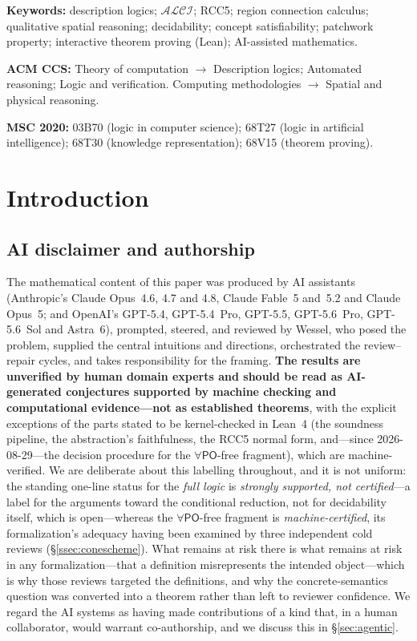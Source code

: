 \documentclass[11pt]{article}
\newcommand{\PO}{\mathsf{PO}}
\newcommand{\ALCI}{\ensuremath{\mathcal{ALCI}}}
\theoremstyle{plain}
\theoremstyle{definition}
\begin{document}
\medskip
\noindent\textbf{Keywords:} description logics; $\ALCI$; RCC5; region
connection calculus; qualitative spatial reasoning; decidability; concept
satisfiability; patchwork property; interactive theorem proving (Lean);
AI-assisted mathematics.

\smallskip
\noindent\textbf{ACM CCS:} Theory of computation $\rightarrow$ Description
logics; Automated reasoning; Logic and verification. Computing
methodologies $\rightarrow$ Spatial and physical reasoning.

\smallskip
\noindent\textbf{MSC 2020:} 03B70 (logic in computer science); 68T27
(logic in artificial intelligence); 68T30 (knowledge representation);
68V15 (theorem proving).

\tableofcontents

\section{Introduction}
\label{sec:intro}

\subsection{AI disclaimer and authorship}
\label{ssec:ai-disclaimer}

The mathematical content of this paper was produced by AI assistants
(Anthropic's Claude Opus~4.6, 4.7 and 4.8, Claude Fable~5 and~5.2 and Claude
Opus~5; and OpenAI's GPT-5.4, GPT-5.4~Pro, GPT-5.5, GPT-5.6~Pro,
GPT-5.6~Sol and Astra~6), prompted, steered, and
reviewed by Wessel, who posed the problem,
supplied the central intuitions and directions, orchestrated the
review--repair cycles, and takes responsibility for the framing.
\textbf{The results are unverified by human domain experts and should be
read as AI-generated conjectures supported by machine checking and
computational evidence---not as established theorems}, with the explicit
exceptions of the parts stated to be kernel-checked in Lean~4 (the
soundness pipeline, the abstraction's faithfulness, the RCC5 normal form,
and---since 2026-08-29---the decision procedure for the $\forall\PO$-free
fragment), which are machine-verified. We are deliberate about this labelling
throughout, and it is not uniform: the standing one-line status for the
\emph{full logic} is \emph{strongly supported, not certified}---a label for
the arguments toward the conditional reduction, not for decidability itself,
which is open---whereas the
$\forall\PO$-free fragment is \emph{machine-certified}, its formalization's
adequacy having been examined by three independent cold reviews
(\S\ref{ssec:conescheme}). What remains at risk there is what remains at
risk in any formalization---that a definition misrepresents the intended
object---which is why those reviews targeted the definitions, and why the
concrete-semantics question was converted into a theorem rather than left to
reviewer confidence. We regard the AI systems as
having made contributions of a kind that, in a human collaborator, would
warrant co-authorship, and we discuss this in \S\ref{sec:agentic}.
\end{document}

